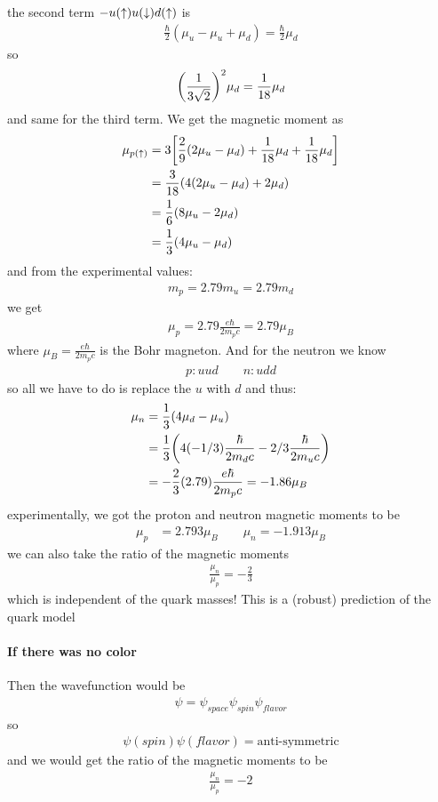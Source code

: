 \documentclass[../main.tex]{subfiles}
\begin{document}
the second term $-u(\uparrow) u(\downarrow) d(\uparrow)$ is
\begin{align*}
    \frac{\hbar}{2} (\mu_u - \mu_u + \mu_d) = \frac{\hbar}{2} \mu_d
\end{align*}
so
\begin{align*}
    \qt(\frac{1}{3\sqrt 2})^2 \mu_d = \frac{1}{18} \mu_d
\end{align*}
and same for the third term. We get the magnetic moment as
\begin{align*}
    \mu_{p(\ua)} &= 3 \qt[\frac{2}{9} (2\mu_u - \mu_d) + \frac{1}{18} \mu_d + \frac{1}{18} \mu_d] \\
    &= \frac{3}{18} (4(2\mu_u - \mu_d) + 2\mu_d) \\
    &= \frac{1}{6} (8\mu_u - 2\mu_d ) \\
    &= \frac{1}{3} (4\mu_u - \mu_d)
\end{align*}
and from the experimental values:
\begin{align*}
    m_p = 2.79 m_u = 2.79 m_d
\end{align*}
we get
\begin{align*}
    \mu_p = 2.79 \frac{e\hbar}{2m_p c} = 2.79 \mu_B
\end{align*}
where $\mu_B = \frac{e\hbar}{2m_p c}$ is the Bohr magneton. And for the neutron we know
\begin{align*}
    p: uud \qquad n: udd
\end{align*}
so all we have to do is replace the $u$ with $d$ and thus:
\begin{align*}
    \mu_n &= \frac{1}{3} (4\mu_d - \mu_u) \\
    &= \frac{1}{3} \qt(4(-1/3) \frac{\hbar}{2m_d c} - 2/3 \frac{\hbar}{2m_u c}) \\
    &= -\frac{2}{3} (2.79) \frac{e\hbar}{2m_p c} = -1.86 \mu_B
\end{align*}
experimentally, we got the proton and neutron magnetic moments to be
\begin{align*}
    \mu_p &= 2.793 \mu_B \qquad \mu_n = -1.913 \mu_B
\end{align*}
we can also take the ratio of the magnetic moments
\begin{align*}
    \frac{\mu_n}{\mu_p} = -\frac{2}{3}
\end{align*}
which is independent of the quark masses! This is a (robust) prediction of the quark model

\paragraph*{If there was no color} Then the wavefunction would be
\begin{align*}
    \psi = \psi_{space} \psi_{spin} \psi_{flavor}
\end{align*}
so
\begin{align*}
    \psi(spin) \psi(flavor) = \text{anti-symmetric}
\end{align*}
and we would get the ratio of the magnetic moments to be
\begin{align*}
    \frac{\mu_n}{\mu_p} = -2
\end{align*}
\end{document}
